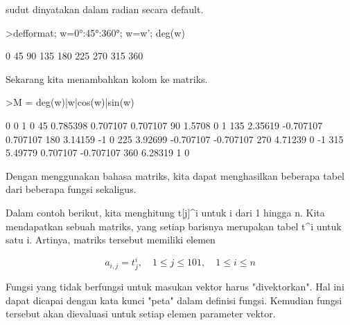 \documentclass[a4paper,10pt]{article}
\begin{document}
\begin{eulernotebook}
\begin{eulercomment}
\begin{eulercomment}
\begin{eulercomment}
\begin{eulercomment}
\begin{eulercomment}
\begin{eulercomment}
\begin{eulercomment}
sudut dinyatakan dalam radian secara default.
\end{eulercomment}
\begin{eulerprompt}
>defformat; w=0°:45°:360°; w=w'; deg(w)
\end{eulerprompt}
\begin{euleroutput}
              0 
             45 
             90 
            135 
            180 
            225 
            270 
            315 
            360 
\end{euleroutput}
\begin{eulercomment}
Sekarang kita menambahkan kolom ke matriks.
\end{eulercomment}
\begin{eulerprompt}
>M = deg(w)|w|cos(w)|sin(w)
\end{eulerprompt}
\begin{euleroutput}
              0             0             1             0 
             45      0.785398      0.707107      0.707107 
             90        1.5708             0             1 
            135       2.35619     -0.707107      0.707107 
            180       3.14159            -1             0 
            225       3.92699     -0.707107     -0.707107 
            270       4.71239             0            -1 
            315       5.49779      0.707107     -0.707107 
            360       6.28319             1             0 
\end{euleroutput}
\begin{eulercomment}
Dengan menggunakan bahasa matriks, kita dapat menghasilkan beberapa
tabel dari beberapa fungsi sekaligus.

Dalam contoh berikut, kita menghitung t[j]\textasciicircum{}i untuk i dari 1 hingga n.
Kita mendapatkan sebuah matriks, yang setiap barisnya merupakan tabel
t\textasciicircum{}i untuk satu i. Artinya, matriks tersebut memiliki elemen \\
\end{eulercomment}
\begin{eulerformula}
\[
a_{i,j} = t_j^i, \quad 1 \le j \le 101, \quad 1 \le i \le n
\]
\end{eulerformula}
\begin{eulercomment}
Fungsi yang tidak berfungsi untuk masukan vektor harus "divektorkan".
Hal ini dapat dicapai dengan kata kunci "peta" dalam definisi fungsi.
Kemudian fungsi tersebut akan dievaluasi untuk setiap elemen parameter
vektor.


\end{eulercomment}
\end{eulercomment}
\end{eulercomment}
\end{eulercomment}
\end{eulercomment}
\end{eulercomment}
\end{eulercomment}
\end{eulernotebook}
\end{document}
